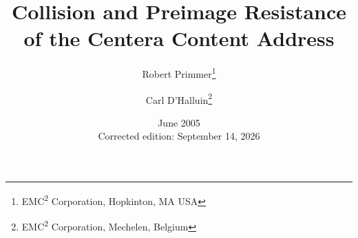 \title{Collision and Preimage Resistance of the Centera Content Address}
\author{Robert Primmer\thanks{EMC\textsuperscript{2} Corporation, Hopkinton, MA USA}
\and Carl D'Halluin\thanks{EMC\textsuperscript{2} Corporation, Mechelen, Belgium}}
\date{June 2005\\{\small Corrected edition: September 14, 2026}}
